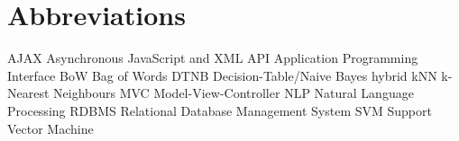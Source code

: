 \chapter*{Abbreviations}

\begin{flushleft}

AJAX \hfill Asynchronous JavaScript and XML
API \hfill Application Programming Interface
BoW \hfill Bag of Words
DTNB \hfill Decision-Table/Naive Bayes hybrid
kNN \hfill k-Nearest Neighbours
MVC \hfill Model-View-Controller
NLP \hfill  Natural Language Processing
RDBMS \hfill Relational Database Management System
SVM \hfill Support Vector Machine

\end{flushleft}